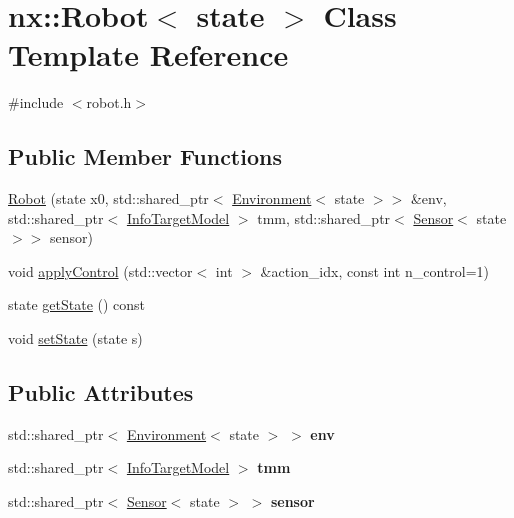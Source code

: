 \hypertarget{classnx_1_1Robot}{}\section{nx\+:\+:Robot$<$ state $>$ Class Template Reference}
\label{classnx_1_1Robot}


{\ttfamily \#include $<$robot.\+h$>$}

\subsection*{Public Member Functions}
\begin{DoxyCompactItemize}
\item 
\hyperlink{classnx_1_1Robot_ae20fd90482b8fd35e5a36f802b202ce7}{Robot} (state x0, std\+::shared\+\_\+ptr$<$ \hyperlink{classnx_1_1Environment}{Environment}$<$ state $>$$>$ \&env, std\+::shared\+\_\+ptr$<$ \hyperlink{classnx_1_1InfoTargetModel}{Info\+Target\+Model} $>$ tmm, std\+::shared\+\_\+ptr$<$ \hyperlink{classnx_1_1Sensor}{Sensor}$<$ state $>$$>$ sensor)
\item 
void \hyperlink{classnx_1_1Robot_a246cd83fad899283d29fc31658a7e601}{apply\+Control} (std\+::vector$<$ int $>$ \&action\+\_\+idx, const int n\+\_\+control=1)
\item 
state \hyperlink{classnx_1_1Robot_a78c21ad01482472ca59521e383e88ae1}{get\+State} () const
\item 
void \hyperlink{classnx_1_1Robot_a36d91b220aa89ec1f654fd225cb54757}{set\+State} (state s)
\end{DoxyCompactItemize}
\subsection*{Public Attributes}
\begin{DoxyCompactItemize}
\item 
\mbox{\label{classnx_1_1Robot_a6a7c48c5f26eddf890702d2470348be8}} 
std\+::shared\+\_\+ptr$<$ \hyperlink{classnx_1_1Environment}{Environment}$<$ state $>$ $>$ {\bfseries env}
\item 
\mbox{\label{classnx_1_1Robot_a4d75b4087149879660d2da1e8544d962}} 
std\+::shared\+\_\+ptr$<$ \hyperlink{classnx_1_1InfoTargetModel}{Info\+Target\+Model} $>$ {\bfseries tmm}
\item 
\mbox{\label{classnx_1_1Robot_afdc113e533c3758d1f77c47fb72bcc87}} 
std\+::shared\+\_\+ptr$<$ \hyperlink{classnx_1_1Sensor}{Sensor}$<$ state $>$ $>$ {\bfseries sensor}
\end{DoxyCompactItemize}
